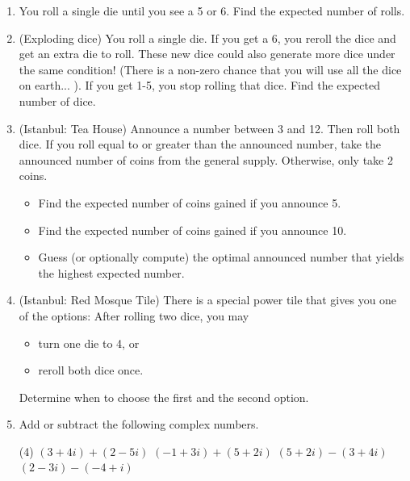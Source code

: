 \begin{enumerate}
\item You roll a single die until you see a 5 or 6. Find the expected number of rolls.
\vspace{70pt}

\item (Exploding dice) You roll a single die. If you get a 6, you reroll the dice and get an extra die to roll. These new dice could also generate more dice under the same condition! (There is a non-zero chance that you will use all the dice on earth... ). If you get 1-5, you stop rolling that dice. Find the expected number of dice.
\vspace{80pt}

\item (Istanbul: Tea House) Announce a number between 3 and 12. Then roll both dice. If you roll equal to or greater than the announced number, take the announced number of coins from the general supply. Otherwise, only take 2 coins.

\begin{itemize}
\item Find the expected number of coins gained if you announce 5.
\item Find the expected number of coins gained if you announce 10.
\item Guess (or optionally compute) the optimal announced number that yields the highest expected number.
\end{itemize}
\vspace{100pt}

\item (Istanbul: Red Mosque Tile) There is a special power tile that gives you one of the options: After rolling two dice, you may
\begin{itemize} 
\item turn one die to 4, or
\item reroll both dice once.
\end{itemize}
Determine when to choose the first and the second option.

\newpage



\item Add or subtract the following complex numbers.
\begin{tasks}[after-skip=30pt, after-item-skip=30pt](4)
\task $(3 + 4i) + (2 - 5i)$
\task $(-1 + 3i) + (5 + 2i)$
\task $(5 + 2i) - (3 + 4i)$
\task $(2 - 3i) - (-4 + i)$
\end{tasks}



\end{enumerate}
